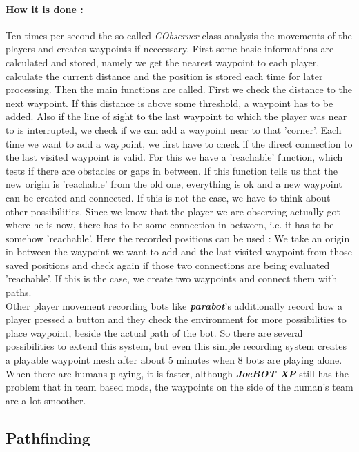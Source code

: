\documentclass[12pt]{article}
\newcommand {\joebotxp}{\textit{\textbf{JoeBOT XP}} }
\begin{document}
\paragraph{How it is done : } Ten times per second the so called \textit{CObserver} class analysis the movements of the players and creates waypoints if neccessary. First some basic informations are calculated and stored, namely we get the nearest waypoint to each player, calculate the current distance and the position is stored each time for later processing. Then the main functions are called. First we check the distance to the next waypoint. If this distance is above some threshold, a waypoint has to be added. Also if the line of sight to the last waypoint to which the player was near to is interrupted, we check if we can add a waypoint near to that 'corner'. Each time we want to add a waypoint, we first have to check if the direct connection to the last visited waypoint is valid. For this we have a 'reachable' function, which tests if there are obstacles or gaps in between. If this function tells us that the new origin is 'reachable' from the old one, everything is ok and a new waypoint can be created and connected. If this is not the case, we have to think about other possibilities. Since we know that the player we are observing actually got where he is now, there has to be some connection in between, i.e. it has to be somehow 'reachable'. Here the recorded positions can be used : We take an origin in between the waypoint we want to add and the last visited waypoint from those saved positions and check again if those two connections are being evaluated 'reachable'. If this is the case, we create two waypoints and connect them with paths.\\
Other player movement recording bots like \textit{\textbf{parabot}}'s additionally record how a player pressed a button and they check the environment for more possibilities to place waypoint, beside the actual path of the bot. So there are several possibilities to extend this system, but even this simple recording system creates a playable waypoint mesh after about 5 minutes when 8 bots are playing alone. When there are humans playing, it is faster, although \joebotxp still has the problem that in team based mods, the waypoints on the side of the human's team are a lot smoother.

\subsection{Pathfinding}
\end{document}
